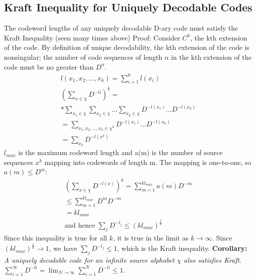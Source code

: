 \documentclass[10pt]{article}
\begin{document}
\begin{tiny}
\begin{multicols}{3}
\section*{Kraft Inequality for Uniquely Decodable Codes}
\thm[McMillan] \label{thm: mcmillan}
The codeword lengths of any uniquely decodable D-ary code must satisfy the Kraft Inequality (seen many times above) \newline
Proof: \newline
Consider ${C^{k}}$, the kth extension of the code. By definition of unique decodability, the kth extension of the code is nonsingular; 
the number of code sequences of length ${n}$ in the kth extension of the code must be no greater than ${D^{n}}$. 
\begin{eqnarray}
l({x_1},{x_2}, \ldots , {x_k}) = \sum_{i=1}^{k} l({x_i})\\
(\sum_{x\in \chi} D^{-li})^{k} = \\*
\sum_{x_1\in\chi}\sum_{x_2\in\chi} \ldots \sum_{x_k\in\chi}  D^{-l({x_1})} \ldots D^{-l({x_k})}\\
=\sum_{{x_1},{x_2}, \ldots , {x_k} \in \chi^{k}}  D^{-l({x_1})}\ldots D^{-l({x_k})} \\
=\sum_{x_k} D^{-l({x^{k}})}
\end{eqnarray}
${l_{max}}$ is the maximum codeword length and a(m) is the number of source sequences
${x^{k}}$ mapping into codewords of length m. The mapping is one-to-one, so $a(m) \leq D^{m}$:
\begin{eqnarray}
(\sum_{x\in\chi} D^{-l(x)})^{k} = \sum_{m=1}^{kl_{max}} a(m)D^{-m}\\
\leq \sum_{m=1}^{kl_{max}} D^{m}D^{-m}\\
=kl_{max}\\
\text{and hence } \sum_j D^{-l_j} \leq (kl_{max})^{\frac{1}{k}}
\end{eqnarray}
Since this inequality is true for all ${k}$, it is true in the limit as ${k} \rightarrow \infty$.
Since ${(kl_{max})^{\frac{1}{k}}} \rightarrow 1$, we have \newline
$\sum_j D^{-l_j} \leq 1$, which is the Kraft inequality.\newline
{\bf Corollary: }{\it A uniquely decodable code for an infinite source alphabet $\chi$ also satisfies Kraft}. \newline
$\sum_{i=1}^{\infty}D^{-li} = \lim_{N\rightarrow\infty}\sum_{i=1}^{N}D^{-li} \leq 1$.




\end{multicols}
\end{tiny}
\end{document}
